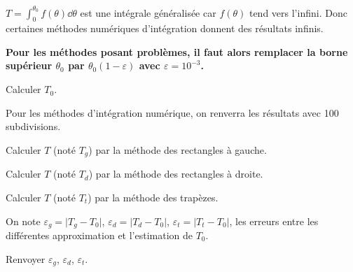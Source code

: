 \begin{rem}
$T=\displaystyle{\int_0^{\theta_0}f(\theta)\dd \theta}$ est une intégrale généralisée car $f(\theta)$ tend vers l'infini. Donc certaines méthodes numériques d'intégration donnent des résultats infinis.

\textbf{Pour les méthodes posant problèmes, il faut alors remplacer la borne supérieur $\theta_0$ par $\theta_0(1-\varepsilon)$ avec $\varepsilon=10^{-3}$.}
\end{rem}


\question{} Calculer $T_0$.

Pour les méthodes d'intégration numérique, on renverra les résultats avec 100 subdivisions.

\question{} Calculer $T$ (noté $T_{g}$) par la méthode des rectangles à gauche.

\question{} Calculer $T$ (noté $T_{d}$) par la méthode des rectangles à droite.

\question{} Calculer $T$ (noté $T_{t}$) par la méthode des trapèzes.

On note $\varepsilon_g=\vert T_g-T_0\vert$,  $\varepsilon_d=\vert T_d-T_0\vert$,  $\varepsilon_t=\vert T_t-T_0\vert$, les erreurs entre les différentes approximation et l'estimation de $T_0$.

\question{} Renvoyer $\varepsilon_g$,  $\varepsilon_d$,  $\varepsilon_t$.


